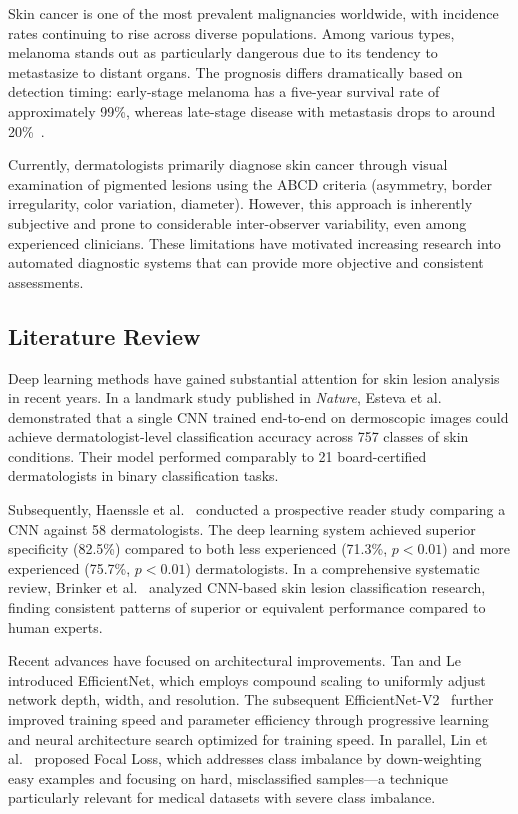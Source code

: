 \documentclass[12pt,a4paper]{article}
\begin{document}
Skin cancer is one of the most prevalent malignancies worldwide, with incidence rates continuing to rise across diverse populations. Among various types, melanoma stands out as particularly dangerous due to its tendency to metastasize to distant organs. The prognosis differs dramatically based on detection timing: early-stage melanoma has a five-year survival rate of approximately 99\%, whereas late-stage disease with metastasis drops to around 20\%~\cite{esteva2017}.

Currently, dermatologists primarily diagnose skin cancer through visual examination of pigmented lesions using the ABCD criteria (asymmetry, border irregularity, color variation, diameter). However, this approach is inherently subjective and prone to considerable inter-observer variability, even among experienced clinicians. These limitations have motivated increasing research into automated diagnostic systems that can provide more objective and consistent assessments.

\subsection{Literature Review}

Deep learning methods have gained substantial attention for skin lesion analysis in recent years. In a landmark study published in \textit{Nature}, Esteva et al.~\cite{esteva2017} demonstrated that a single CNN trained end-to-end on dermoscopic images could achieve dermatologist-level classification accuracy across 757 classes of skin conditions. Their model performed comparably to 21 board-certified dermatologists in binary classification tasks.

Subsequently, Haenssle et al.~\cite{haenssle2018} conducted a prospective reader study comparing a CNN against 58 dermatologists. The deep learning system achieved superior specificity (82.5\%) compared to both less experienced (71.3\%, $p < 0.01$) and more experienced (75.7\%, $p < 0.01$) dermatologists. In a comprehensive systematic review, Brinker et al.~\cite{brinker2019} analyzed CNN-based skin lesion classification research, finding consistent patterns of superior or equivalent performance compared to human experts.

Recent advances have focused on architectural improvements. Tan and Le~\cite{tan2019} introduced EfficientNet, which employs compound scaling to uniformly adjust network depth, width, and resolution. The subsequent EfficientNet-V2~\cite{tan2021} further improved training speed and parameter efficiency through progressive learning and neural architecture search optimized for training speed. In parallel, Lin et al.~\cite{lin2017} proposed Focal Loss, which addresses class imbalance by down-weighting easy examples and focusing on hard, misclassified samples---a technique particularly relevant for medical datasets with severe class imbalance.
\end{document}

